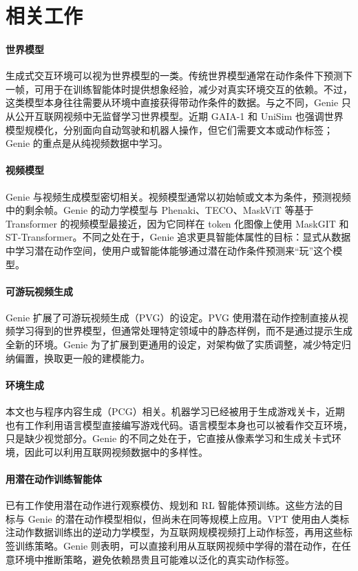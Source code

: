 \documentclass[10pt]{article}
\begin{document}
\section{相关工作}

\paragraph{世界模型}
生成式交互环境可以视为世界模型的一类。传统世界模型通常在动作条件下预测下一帧，可用于在训练智能体时提供想象经验，减少对真实环境交互的依赖。不过，这类模型本身往往需要从环境中直接获得带动作条件的数据。与之不同，Genie 只从公开互联网视频中无监督学习世界模型。近期 GAIA-1 和 UniSim 也强调世界模型规模化，分别面向自动驾驶和机器人操作，但它们需要文本或动作标签；Genie 的重点是从纯视频数据中学习。

\paragraph{视频模型}
Genie 与视频生成模型密切相关。视频模型通常以初始帧或文本为条件，预测视频中的剩余帧。Genie 的动力学模型与 Phenaki、TECO、MaskViT 等基于 Transformer 的视频模型最接近，因为它同样在 token 化图像上使用 MaskGIT 和 ST-Transformer。不同之处在于，Genie 追求更具智能体属性的目标：显式从数据中学习潜在动作空间，使用户或智能体能够通过潜在动作条件预测来“玩”这个模型。

\paragraph{可游玩视频生成}
Genie 扩展了可游玩视频生成（PVG）的设定。PVG 使用潜在动作控制直接从视频学习得到的世界模型，但通常处理特定领域中的静态样例，而不是通过提示生成全新的环境。Genie 为了扩展到更通用的设定，对架构做了实质调整，减少特定归纳偏置，换取更一般的建模能力。

\paragraph{环境生成}
本文也与程序内容生成（PCG）相关。机器学习已经被用于生成游戏关卡，近期也有工作利用语言模型直接编写游戏代码。语言模型本身也可以被看作交互环境，只是缺少视觉部分。Genie 的不同之处在于，它直接从像素学习和生成关卡式环境，因此可以利用互联网视频数据中的多样性。

\paragraph{用潜在动作训练智能体}
已有工作使用潜在动作进行观察模仿、规划和 RL 智能体预训练。这些方法的目标与 Genie 的潜在动作模型相似，但尚未在同等规模上应用。VPT 使用由人类标注动作数据训练出的逆动力学模型，为互联网规模视频打上动作标签，再用这些标签训练策略。Genie 则表明，可以直接利用从互联网视频中学得的潜在动作，在任意环境中推断策略，避免依赖昂贵且可能难以泛化的真实动作标签。
\end{document}
